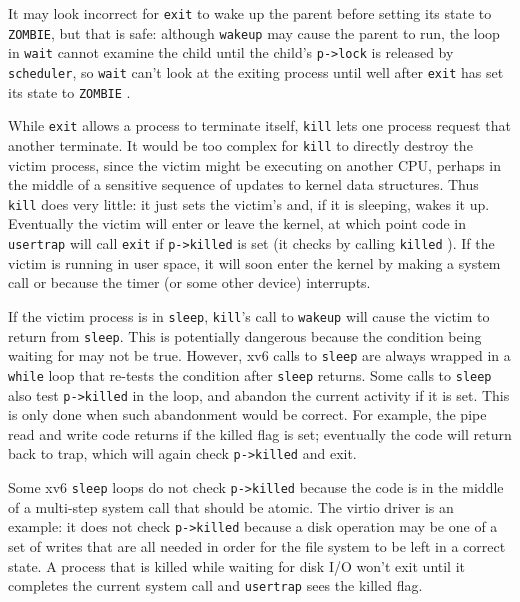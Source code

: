 It may look incorrect for \lstinline{exit} to wake up the parent
before setting its state to \lstinline{ZOMBIE}, 
but that is safe:
although
\lstinline{wakeup}
may cause the parent to run,
the loop in
\lstinline{wait}
cannot examine the child until the child's
\lstinline{p->lock}
is released by {\tt scheduler},
so
\lstinline{wait}
can't look at
the exiting process until well after
\lstinline{exit}
has set its state to
\lstinline{ZOMBIE}
.

While
\lstinline{exit} 
allows a process to terminate itself,
\lstinline{kill}
lets one process request that another terminate.
It would be too complex for
\lstinline{kill}
to directly destroy the victim process, since the victim
might be executing on another CPU, perhaps
in the middle of a sensitive sequence of updates to kernel data structures.
Thus
\lstinline{kill}
does very little: it just sets the victim's
and, if it is sleeping, wakes it up.
Eventually the victim will enter or leave the kernel,
at which point code in
\lstinline{usertrap}
will call
\lstinline{exit}
if
\lstinline{p->killed}
is set
(it checks by calling
\lstinline{killed}
).
If the victim is running in user space, it will soon enter
the kernel by making a system call or because the timer (or
some other device) interrupts.

If the victim process is in
\lstinline{sleep},
\lstinline{kill}'s call to
\lstinline{wakeup}
will cause the victim to return from
\lstinline{sleep}.
This is potentially dangerous because 
the condition being waiting for may not be true.
However, xv6 calls to
\lstinline{sleep}
are always wrapped in a
\lstinline{while}
loop that re-tests the condition after
\lstinline{sleep}
returns.
Some calls to
\lstinline{sleep}
also test
\lstinline{p->killed}
in the loop, and abandon the current activity if it is set.
This is only done when such abandonment would be correct.
For example, the pipe read and write code
returns if the killed flag is set; eventually the
code will return back to trap, which will again
check \lstinline{p->killed} and exit.

Some xv6 
\lstinline{sleep}
loops do not check
\lstinline{p->killed} 
because the code is in the middle of a multi-step
system call that should be atomic.
The virtio driver
is an example: it does not check
\lstinline{p->killed}
because a disk operation may be one of a set of
writes that are all needed in order for the file system to
be left in a correct state.
A process that is killed while waiting for disk I/O won't
exit until it completes the current system call and
\lstinline{usertrap} sees the killed flag.


